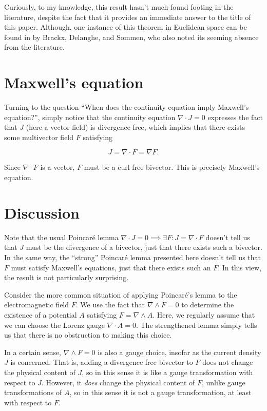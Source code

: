 \documentclass{article}
\begin{document}
Curiously, to my knowledge, this result hasn't much found footing in the literature, despite the fact that it provides an immediate answer to the title of this paper. Although, one instance of this theorem in Euclidean space can be found in \cite{brackx} by Brackx, Delanghe, and Sommen, who also noted its seeming absence from the literature.

\section{Maxwell's equation}

Turning to the question ``When does the continuity equation imply Maxwell's equation?'', simply notice that the continuity equation $\nabla \cdot J = 0$ expresses the fact that $J$ (here a vector field) is divergence free, which implies that there exists some multivector field $F$ satisfying

\begin{equation}
    J = \nabla \cdot F = \nabla F.
\end{equation}

Since $\nabla \cdot F$ is a vector, $F$ must be a curl free bivector. This is precisely Maxwell's equation.

\section{Discussion}

Note that the usual Poincar\'e lemma $\nabla \cdot J = 0 \implies \exists F : J = \nabla \cdot F$ doesn't tell us that $J$ must be the divergence of a bivector, just that there exists such a bivector. In the same way, the ``strong'' Poincar\'e lemma presented here doesn't tell us that $F$ must satisfy Maxwell's equations, just that there exists such an $F$. In this view, the result is not particularly surprising.

Consider the more common situation of applying Poincar\'e's lemma to the electromagnetic field $F$. We use the fact that $\nabla \wedge F = 0$ to determine the existence of a potential $A$ satisfying $F = \nabla \wedge A$. Here, we regularly assume that we can choose the Lorenz gauge $\nabla \cdot A = 0$. The strengthened lemma simply tells us that there is no obstruction to making this choice.

In a certain sense, $\nabla \wedge F = 0$ is also a gauge choice, insofar as the current density $J$ is concerned. That is, adding a divergence free bivector to $F$ does not change the physical content of $J$, so in this sense it is like a gauge transformation with respect to $J$. However, it \emph{does} change the physical content of $F$, unlike gauge transformations of $A$, so in this sense it is not a gauge transformation, at least with respect to $F$.
\end{document}
